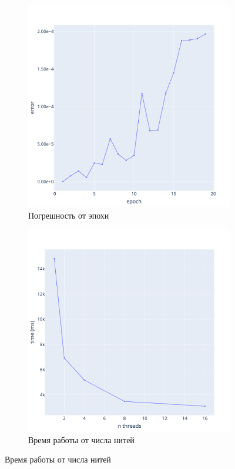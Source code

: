 \documentclass[a4paper,hidelinks,12pt]{article}
\begin{document}
\begin{figure}[H]
\begin{subfigure}{.5\textwidth}
  \centering
  \includegraphics[width=\linewidth]{pictures/Lpi_128_err.png}
  \caption{Погрешность от эпохи}
\end{subfigure}%
\begin{subfigure}{.5\textwidth}
  \centering
  \includegraphics[width=\linewidth]{pictures/Lpi_128_time_threads.png}
  \caption{Время работы от числа нитей}
\end{subfigure}%
\end{figure}
\end{document}
